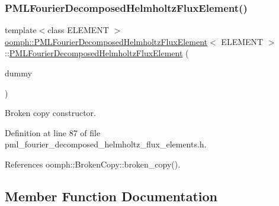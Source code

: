 \subsubsection{\texorpdfstring{P\+M\+L\+Fourier\+Decomposed\+Helmholtz\+Flux\+Element()}{PMLFourierDecomposedHelmholtzFluxElement()}\hspace{0.1cm}{\footnotesize\ttfamily [3/3]}}
{\footnotesize\ttfamily template$<$class E\+L\+E\+M\+E\+NT $>$ \\
\hyperlink{classoomph_1_1PMLFourierDecomposedHelmholtzFluxElement}{oomph\+::\+P\+M\+L\+Fourier\+Decomposed\+Helmholtz\+Flux\+Element}$<$ E\+L\+E\+M\+E\+NT $>$\+::\hyperlink{classoomph_1_1PMLFourierDecomposedHelmholtzFluxElement}{P\+M\+L\+Fourier\+Decomposed\+Helmholtz\+Flux\+Element} (\begin{DoxyParamCaption}\item[{const \hyperlink{classoomph_1_1PMLFourierDecomposedHelmholtzFluxElement}{P\+M\+L\+Fourier\+Decomposed\+Helmholtz\+Flux\+Element}$<$ E\+L\+E\+M\+E\+NT $>$ \&}]{dummy }\end{DoxyParamCaption})\hspace{0.3cm}{\ttfamily [inline]}}



Broken copy constructor. 



Definition at line 87 of file pml\+\_\+fourier\+\_\+decomposed\+\_\+helmholtz\+\_\+flux\+\_\+elements.\+h.



References oomph\+::\+Broken\+Copy\+::broken\+\_\+copy().



\subsection{Member Function Documentation}
\mbox{\label{classoomph_1_1PMLFourierDecomposedHelmholtzFluxElement_aa24365f7454ab68b0c1b989cc34bd34b}} 
